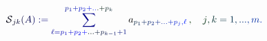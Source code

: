 \documentclass[12pt]{article}
\begin{document}
\makeatletter
\renewcommand*{\@textcolor}[3]{%
  \protect\leavevmode
  \begingroup
    \color#1{#2}#3%
  \endgroup
}
\makeatother
\begin{displaymath}
\mathcal { \mathcolor[RGB]{0,0,15}{S} } _ { \mathcolor[RGB]{0,0,30}{j} \mathcolor[RGB]{0,0,45}{k} } \mathcolor[RGB]{0,0,60}{(} \mathcolor[RGB]{0,0,75}{A} \mathcolor[RGB]{0,0,90}{)} \mathcolor[RGB]{0,0,105}{:} \mathcolor[RGB]{0,0,120}{=} \mathcolor[RGB]{0,0,135}{\sum} _ { \mathcolor[RGB]{0,0,150}{\ell} \mathcolor[RGB]{0,0,165}{=} \mathcolor[RGB]{0,0,180}{p} _ { \mathcolor[RGB]{0,0,195}{1} } \mathcolor[RGB]{0,0,210}{+} \mathcolor[RGB]{0,0,225}{p} _ { \mathcolor[RGB]{0,0,240}{2} } \mathcolor[RGB]{0,0,255}{+} \mathcolor[RGB]{0,15,0}{.} \mathcolor[RGB]{0,15,15}{.} \mathcolor[RGB]{0,15,30}{.} \mathcolor[RGB]{0,15,45}{+} \mathcolor[RGB]{0,15,60}{p} _ { \mathcolor[RGB]{0,15,75}{k} \mathcolor[RGB]{0,15,90}{-} \mathcolor[RGB]{0,15,105}{1} } \mathcolor[RGB]{0,15,120}{+} \mathcolor[RGB]{0,15,135}{1} } ^ { \mathcolor[RGB]{0,15,150}{p} _ { \mathcolor[RGB]{0,15,165}{1} } \mathcolor[RGB]{0,15,180}{+} \mathcolor[RGB]{0,15,195}{p} _ { \mathcolor[RGB]{0,15,210}{2} } \mathcolor[RGB]{0,15,225}{+} \mathcolor[RGB]{0,15,240}{.} \mathcolor[RGB]{0,15,255}{.} \mathcolor[RGB]{0,30,0}{.} \mathcolor[RGB]{0,30,15}{+} \mathcolor[RGB]{0,30,30}{p} _ { \mathcolor[RGB]{0,30,45}{k} } }
a _ { \mathcolor[RGB]{0,30,60}{p} _ { \mathcolor[RGB]{0,30,75}{1} } \mathcolor[RGB]{0,30,90}{+} \mathcolor[RGB]{0,30,105}{p} _ { \mathcolor[RGB]{0,30,120}{2} } \mathcolor[RGB]{0,30,135}{+} \mathcolor[RGB]{0,30,150}{.} \mathcolor[RGB]{0,30,165}{.} \mathcolor[RGB]{0,30,180}{.} \mathcolor[RGB]{0,30,195}{+} \mathcolor[RGB]{0,30,210}{p} _ { \mathcolor[RGB]{0,30,225}{j} } \mathcolor[RGB]{0,30,240}{,} \mathcolor[RGB]{0,30,255}{\ell} } \, \mathcolor[RGB]{0,45,0}{,} \quad \mathcolor[RGB]{0,45,15}{j} \mathcolor[RGB]{0,45,30}{,} \mathcolor[RGB]{0,45,45}{k} \mathcolor[RGB]{0,45,60}{=} \mathcolor[RGB]{0,45,75}{1} \mathcolor[RGB]{0,45,90}{,} \mathcolor[RGB]{0,45,105}{.} \mathcolor[RGB]{0,45,120}{.} \mathcolor[RGB]{0,45,135}{.} \mathcolor[RGB]{0,45,150}{,} \mathcolor[RGB]{0,45,165}{m} \mathcolor[RGB]{0,45,180}{.}
\end{displaymath}
\end{document}
